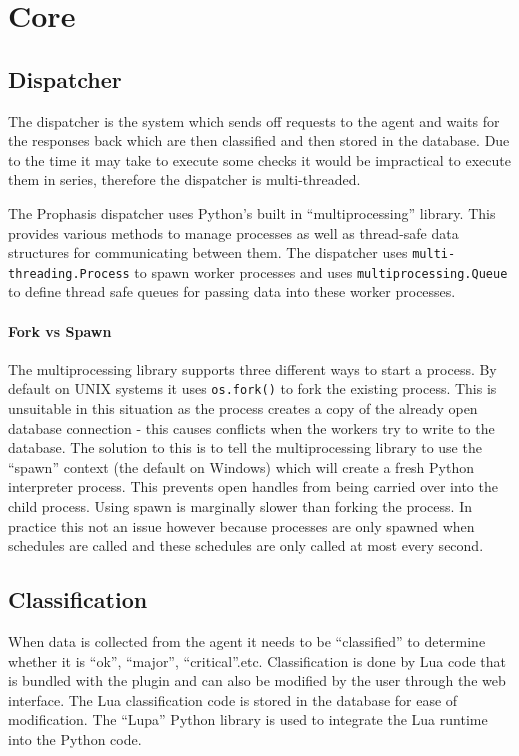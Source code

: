 \documentclass[bsc,deptreport,twoside,parskip,singlespacing,notimes]{infthesis}
\begin{document}
\section{Core}
\subsection{Dispatcher}

	The dispatcher is the system which sends off requests to the agent and waits
	for the responses back which are then classified and then stored in the
	database.  Due to the time it may take to execute some checks it would be
	impractical to execute them in series, therefore the dispatcher is
	multi-threaded.


	The Prophasis dispatcher uses Python's built in ``multiprocessing'' library. This
	provides various methods to manage processes as well as thread-safe data
	structures for communicating between them.  The dispatcher uses\linebreak
	\texttt{multi-threading.Process} to spawn worker processes and uses\linebreak
	\texttt{multiprocessing.Queue} to define thread safe queues for passing data
	into these worker processes.

\paragraph*{Fork vs Spawn}
	The multiprocessing library supports three different ways to start a process.
	By default on UNIX systems it uses \texttt{os.fork()} to fork the existing
	process. This is unsuitable in this situation as the process creates a copy of
	the already open database connection - this causes conflicts when the workers
	try to write to the database.  The solution to this is to tell the
	multiprocessing library to use the ``spawn'' context (the default on Windows)
	which will create a fresh Python interpreter process. This prevents open
	handles from being carried over into the child process. Using spawn is
	marginally slower than forking the process. In practice this not an issue however
	because processes are only spawned when schedules are called and these
	schedules are only called at most every second.

\subsection{Classification}

	When data is collected from the agent it needs to be ``classified'' to determine
	whether it is ``ok'', ``major'', ``critical''.etc.  Classification is done by Lua
	code that is bundled with the plugin and can also be modified by the user
	through the web interface.  The Lua classification code is stored in the
	database for ease of modification.  The ``Lupa'' Python library is used to
	integrate the Lua runtime into the Python code.
\end{document}
